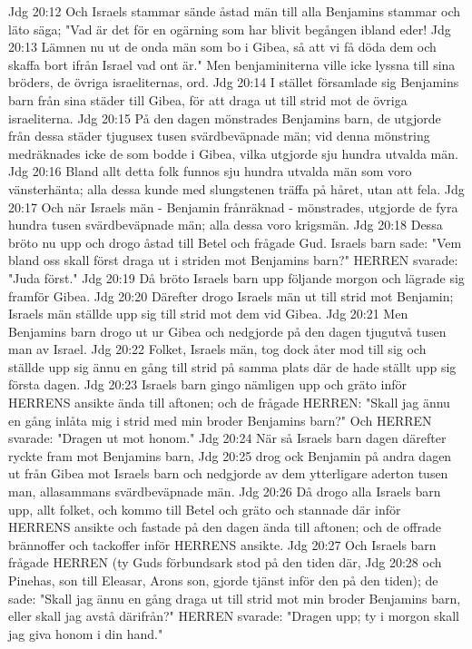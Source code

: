 Jdg 20:12  Och Israels stammar sände åstad män till alla Benjamins stammar och läto säga; "Vad är det för en ogärning som har blivit begången ibland eder!
Jdg 20:13  Lämnen nu ut de onda män som bo i Gibea, så att vi få döda dem och skaffa bort ifrån Israel vad ont är." Men benjaminiterna ville icke lyssna till sina bröders, de övriga israeliternas, ord.
Jdg 20:14  I stället församlade sig Benjamins barn från sina städer till Gibea, för att draga ut till strid mot de övriga israeliterna.
Jdg 20:15  På den dagen mönstrades Benjamins barn, de utgjorde från dessa städer tjugusex tusen svärdbeväpnade män; vid denna mönstring medräknades icke de som bodde i Gibea, vilka utgjorde sju hundra utvalda män.
Jdg 20:16  Bland allt detta folk funnos sju hundra utvalda män som voro vänsterhänta; alla dessa kunde med slungstenen träffa på håret, utan att fela.
Jdg 20:17  Och när Israels män - Benjamin frånräknad - mönstrades, utgjorde de fyra hundra tusen svärdbeväpnade män; alla dessa voro krigsmän.
Jdg 20:18  Dessa bröto nu upp och drogo åstad till Betel och frågade Gud. Israels barn sade: "Vem bland oss skall först draga ut i striden mot Benjamins barn?" HERREN svarade: "Juda först."
Jdg 20:19  Då bröto Israels barn upp följande morgon och lägrade sig framför Gibea.
Jdg 20:20  Därefter drogo Israels män ut till strid mot Benjamin; Israels män ställde upp sig till strid mot dem vid Gibea.
Jdg 20:21  Men Benjamins barn drogo ut ur Gibea och nedgjorde på den dagen tjugutvå tusen man av Israel.
Jdg 20:22  Folket, Israels män, tog dock åter mod till sig och ställde upp sig ännu en gång till strid på samma plats där de hade ställt upp sig första dagen.
Jdg 20:23  Israels barn gingo nämligen upp och gräto inför HERRENS ansikte ända till aftonen; och de frågade HERREN: "Skall jag ännu en gång inlåta mig i strid med min broder Benjamins barn?" Och HERREN svarade: "Dragen ut mot honom."
Jdg 20:24  När så Israels barn dagen därefter ryckte fram mot Benjamins barn,
Jdg 20:25  drog ock Benjamin på andra dagen ut från Gibea mot Israels barn och nedgjorde av dem ytterligare aderton tusen man, allasammans svärdbeväpnade män.
Jdg 20:26  Då drogo alla Israels barn upp, allt folket, och kommo till Betel och gräto och stannade där inför HERRENS ansikte och fastade på den dagen ända till aftonen; och de offrade brännoffer och tackoffer inför HERRENS ansikte.
Jdg 20:27  Och Israels barn frågade HERREN (ty Guds förbundsark stod på den tiden där,
Jdg 20:28  och Pinehas, son till Eleasar, Arons son, gjorde tjänst inför den på den tiden); de sade: "Skall jag ännu en gång draga ut till strid mot min broder Benjamins barn, eller skall jag avstå därifrån?" HERREN svarade: "Dragen upp; ty i morgon skall jag giva honom i din hand."
